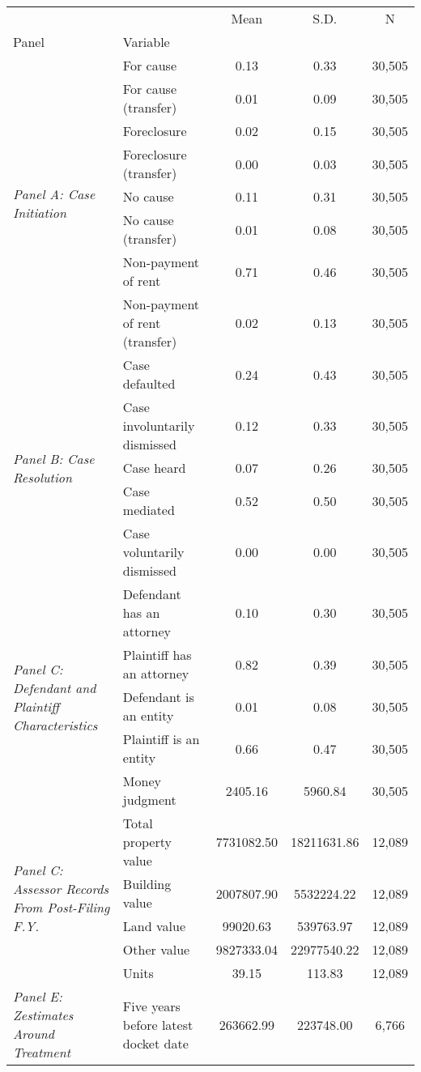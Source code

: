 \begin{tabular}{llccc}
\toprule
 &  & Mean & S.D. & N \\
Panel & Variable &  &  &  \\
\midrule
\multirow[c]{8}{4cm}{\textit{Panel A: Case Initiation}} & For cause & 0.13 & 0.33 & 30,505 \\
 & For cause (transfer) & 0.01 & 0.09 & 30,505 \\
 & Foreclosure & 0.02 & 0.15 & 30,505 \\
 & Foreclosure (transfer) & 0.00 & 0.03 & 30,505 \\
 & No cause & 0.11 & 0.31 & 30,505 \\
 & No cause (transfer) & 0.01 & 0.08 & 30,505 \\
 & Non-payment of rent & 0.71 & 0.46 & 30,505 \\
 & Non-payment of rent (transfer) & 0.02 & 0.13 & 30,505 \\
\cline{1-5}
\multirow[c]{5}{4cm}{\textit{Panel B: Case Resolution}} & Case defaulted & 0.24 & 0.43 & 30,505 \\
 & Case involuntarily dismissed & 0.12 & 0.33 & 30,505 \\
 & Case heard & 0.07 & 0.26 & 30,505 \\
 & Case mediated & 0.52 & 0.50 & 30,505 \\
 & Case voluntarily dismissed & 0.00 & 0.00 & 30,505 \\
\cline{1-5}
\multirow[c]{5}{4cm}{\textit{Panel C: Defendant and Plaintiff Characteristics}} & Defendant has an attorney & 0.10 & 0.30 & 30,505 \\
 & Plaintiff has an attorney & 0.82 & 0.39 & 30,505 \\
 & Defendant is an entity & 0.01 & 0.08 & 30,505 \\
 & Plaintiff is an entity & 0.66 & 0.47 & 30,505 \\
 & Money judgment & 2405.16 & 5960.84 & 30,505 \\
\cline{1-5}
\multirow[c]{5}{4cm}{\textit{Panel C: Assessor Records From Post-Filing F.Y.}} & Total property value & 7731082.50 & 18211631.86 & 12,089 \\
 & Building value & 2007807.90 & 5532224.22 & 12,089 \\
 & Land value & 99020.63 & 539763.97 & 12,089 \\
 & Other value & 9827333.04 & 22977540.22 & 12,089 \\
 & Units & 39.15 & 113.83 & 12,089 \\
\cline{1-5}
\multirow[c]{9}{4cm}{\textit{Panel E: Zestimates Around Treatment}} & Five years before latest docket date & 263662.99 & 223748.00 & 6,766 \\

\end{tabular}
